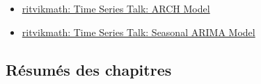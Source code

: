 \documentclass[12pt, titlepage, french]{report}
\begin{document}
\begin{YTB_vids}
\begin{itemize}
	\item	\href{https://www.youtube.com/watch?v=Li95a2biFCU&list=PLvcbYUQ5t0UHOLnBzl46_Q6QKtFgfMGc3&index=8}{ritvikmath: Time Series Talk: ARCH Model}
	\item	\href{https://www.youtube.com/watch?v=WjeGUs6mzXg&list=PLvcbYUQ5t0UHOLnBzl46_Q6QKtFgfMGc3&index=2}{ritvikmath: Time Series Talk: Seasonal ARIMA Model}
\end{itemize}
\end{YTB_vids}

\subsection{Résumés des chapitres}
\end{document}
